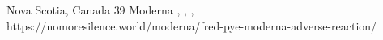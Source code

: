           {Nova Scotia, Canada}
          {39}
          {Moderna}
          {}
          {
            ,
            ,
            ,
          }
          {https://nomoresilence.world/moderna/fred-pye-moderna-adverse-reaction/}

